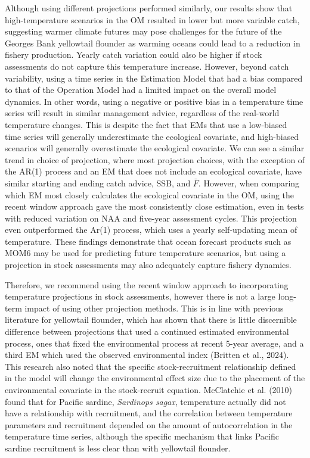 \documentclass[
  12pt,
]{article}
\begin{document}
Although using different projections performed similarly, our results show that high-temperature scenarios in the OM resulted in lower but more variable catch, suggesting warmer climate futures may pose challenges for the future of the Georges Bank yellowtail flounder as warming oceans could lead to a reduction in fishery production. Yearly catch variation could also be higher if stock assessments do not capture this temperature increase. However, beyond catch variability, using a time series in the Estimation Model that had a bias compared to that of the Operation Model had a limited impact on the overall model dynamics. In other words, using a negative or positive bias in a temperature time series will result in similar management advice, regardless of the real-world temperature changes. This is despite the fact that EMs that use a low-biased time series will generally underestimate the ecological covariate, and high-biased scenarios will generally overestimate the ecological covariate. We can see a similar trend in choice of projection, where most projection choices, with the exception of the AR(1) process and an EM that does not include an ecological covariate, have similar starting and ending catch advice, SSB, and \(\bar{F}\). However, when comparing which EM most closely calculates the ecological covariate in the OM, using the recent window approach gave the most consistently close estimation, even in tests with reduced variation on NAA and five-year assessment cycles. This projection even outperformed the Ar(1) process, which uses a yearly self-updating mean of temperature. These findings demonstrate that ocean forecast products such as MOM6 may be used for predicting future temperature scenarios, but using a projection in stock assessments may also adequately capture fishery dynamics.

Therefore, we recommend using the recent window approach to incorporating temperature projections in stock assessments, however there is not a large long-term impact of using other projection methods. This is in line with previous literature for yellowtail flounder, which has shown that there is little discernible difference between projections that used a continued estimated environmental process, ones that fixed the environmental process at recent 5-year average, and a third EM which used the observed environmental index (Britten et al., 2024). This research also noted that the specific stock-recruitment relationship defined in the model will change the environmental effect size due to the placement of the environmental covariate in the stock-recruit equation. McClatchie et al. (2010) found that for Pacific sardine, \emph{Sardinops sagax}, temperature actually did not have a relationship with recruitment, and the correlation between temperature parameters and recruitment depended on the amount of autocorrelation in the temperature time series, although the specific mechanism that links Pacific sardine recruitment is less clear than with yellowtail flounder.
\end{document}
